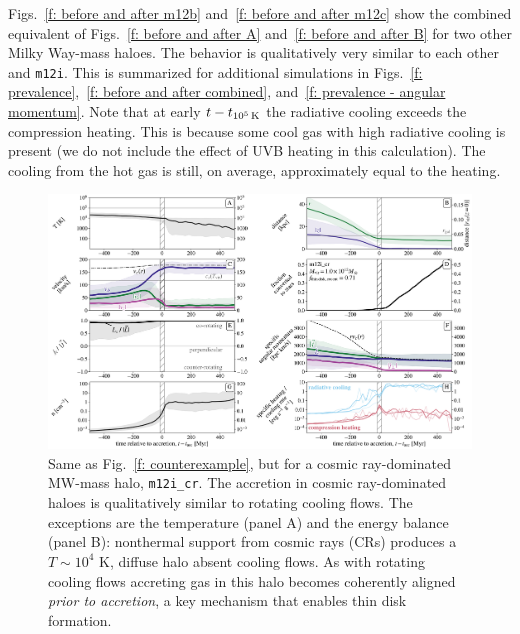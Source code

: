 \documentclass[fleqn,usenatbib]{mnras}
\newcommand{\tcools}{t_{10^5\,{\rm K}}}
\begin{document}
Figs.~\ref{f: before and after m12b} and~\ref{f: before and after m12c} show the combined equivalent of Figs.~\ref{f: before and after A} and~\ref{f: before and after B} for two other Milky Way-mass haloes.
The behavior is qualitatively very similar to each other and \texttt{m12i}.
This is summarized for additional simulations in Figs.~\ref{f: prevalence},~\ref{f: before and after combined}, and~\ref{f: prevalence - angular momentum}.
Note that at early $t - \tcools$ the radiative cooling exceeds the compression heating.
This is because some cool gas with high radiative cooling is present (we do not include the effect of UVB heating in this calculation).
The cooling from the hot gas is still, on average, approximately equal to the heating.


\begin{figure}
\includegraphics[width=\textwidth]{figures/variations/relative_to_accretion/before_and_after/before_and_after_allone_m12i_cr.pdf}
\caption{
Same as Fig.~\ref{f: counterexample}, but for a cosmic ray-dominated MW-mass halo, \texttt{m12i\_cr}.
The accretion in cosmic ray-dominated haloes is qualitatively similar to rotating cooling flows.
The exceptions are the temperature (panel A) and the energy balance (panel B): nonthermal support from cosmic rays (CRs) produces a $T\sim 10^4$ K, diffuse halo absent cooling flows.
As with rotating cooling flows accreting gas in this halo becomes coherently aligned \textit{prior to accretion}, a key mechanism that enables thin disk formation.
}
\label{f: before and after m12i cr}
\end{figure}
\end{document}
